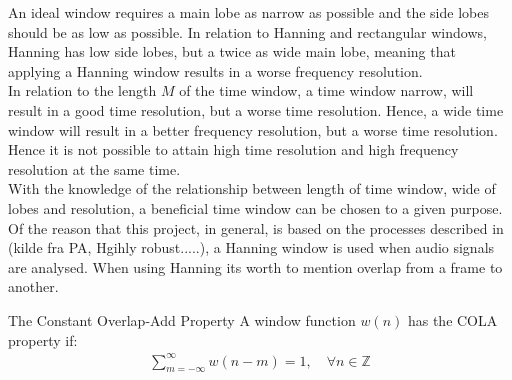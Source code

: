 An ideal window requires a main lobe as narrow as possible and the side lobes should be as low as possible\cite[56]{layer2015signal}. In relation to Hanning and rectangular windows, Hanning has low side lobes, but a twice as wide main lobe, meaning that applying a Hanning window results in a worse frequency resolution.
\\
In relation to the length $M$ of the time window, a time window narrow, will result in a good time resolution, but a worse time resolution. Hence, a wide time window will result in a better frequency resolution, but a worse time resolution.
Hence it is not possible to attain high time resolution and high frequency resolution at the same time. 
\\
With the knowledge of the relationship between length of time window, wide of lobes and resolution, a beneficial time window can be chosen to a given purpose.\\

Of the reason that this project, in general, is based on the processes described in (kilde fra PA, Hgihly robust.....), a Hanning window is used when audio signals are analysed. When using Hanning its worth to mention overlap from a frame to another. 

\begin{definition}{The Constant Overlap-Add Property}
A window function $w(n)$ has the COLA property if:
\begin{align*}
    \sum_{m=-\infty}^{\infty}w(n-m)=1,\quad \forall n \in \mathbb{Z}
\end{align*} 
\end{definition}







